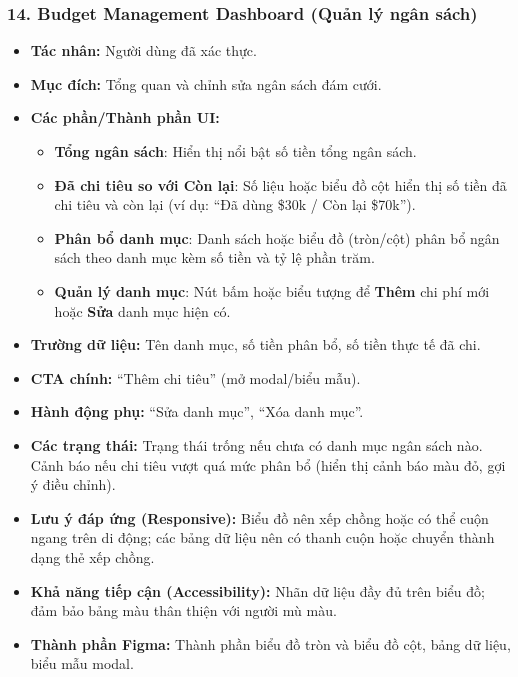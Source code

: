 \documentclass[11pt,a4paper]{article}
\begin{document}
\subsubsection{14. Budget Management Dashboard (Quản lý ngân sách)}
\begin{itemize}
    \item \textbf{Tác nhân:} Người dùng đã xác thực.
    \item \textbf{Mục đích:} Tổng quan và chỉnh sửa ngân sách đám cưới.
    \item \textbf{Các phần/Thành phần UI:}
    \begin{itemize}
        \item \textbf{Tổng ngân sách}: Hiển thị nổi bật số tiền tổng ngân sách.
        \item \textbf{Đã chi tiêu so với Còn lại}: Số liệu hoặc biểu đồ cột hiển thị số tiền đã chi tiêu và còn lại (ví dụ: ``Đã dùng \$30k / Còn lại \$70k'').
        \item \textbf{Phân bổ danh mục}: Danh sách hoặc biểu đồ (tròn/cột) phân bổ ngân sách theo danh mục kèm số tiền và tỷ lệ phần trăm.
        \item \textbf{Quản lý danh mục}: Nút bấm hoặc biểu tượng để \textbf{Thêm} chi phí mới hoặc \textbf{Sửa} danh mục hiện có.
    \end{itemize}
    \item \textbf{Trường dữ liệu:} Tên danh mục, số tiền phân bổ, số tiền thực tế đã chi.
    \item \textbf{CTA chính:} ``Thêm chi tiêu'' (mở modal/biểu mẫu).
    \item \textbf{Hành động phụ:} ``Sửa danh mục'', ``Xóa danh mục''.
    \item \textbf{Các trạng thái:} Trạng thái trống nếu chưa có danh mục ngân sách nào. Cảnh báo nếu chi tiêu vượt quá mức phân bổ (hiển thị cảnh báo màu đỏ, gợi ý điều chỉnh).
    \item \textbf{Lưu ý đáp ứng (Responsive):} Biểu đồ nên xếp chồng hoặc có thể cuộn ngang trên di động; các bảng dữ liệu nên có thanh cuộn hoặc chuyển thành dạng thẻ xếp chồng.
    \item \textbf{Khả năng tiếp cận (Accessibility):} Nhãn dữ liệu đầy đủ trên biểu đồ; đảm bảo bảng màu thân thiện với người mù màu.
    \item \textbf{Thành phần Figma:} Thành phần biểu đồ tròn và biểu đồ cột, bảng dữ liệu, biểu mẫu modal.
\end{itemize}
\end{document}

